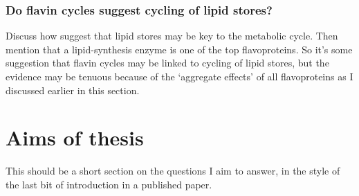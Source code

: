 \subsubsection{Do flavin cycles suggest cycling of lipid stores?}
\label{subsubsec:intro-flavin-ymc-lipid_cycling}

Discuss how \citet{campbellBuildingBlocksAre2020} suggest that lipid stores may be key to the metabolic cycle.
Then mention that a lipid-synthesis enzyme is one of the top flavoproteins.
So it's some suggestion that flavin cycles may be linked to cycling of lipid stores, but the evidence may be tenuous because of the `aggregate effects' of all flavoproteins as I discussed earlier in this section.

\section{Aims of thesis} %
\label{sec:intro-end}

This should be a short section on the questions I aim to answer, in the style of the last bit of introduction in a published paper.

